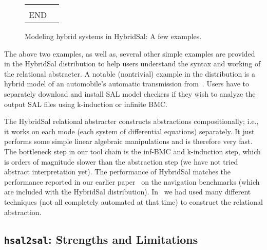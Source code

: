 \documentclass{llncs}
\begin{document}
\begin{figure}[htb!]
\begin{tt}
\begin{tabular}{ll}
\begin{minipage}{2in}
\begin{tabbing}
%
%
\\
END
\end{tabbing}
\end{minipage}
\end{tabular}
\end{tt}
\caption{Modeling hybrid systems in HybridSal: A few examples.}
\label{fig:ex}
\end{figure}

The above two examples, as well as,
several other simple examples are provided in the
HybridSal distribution to help
users understand the syntax and working of the
relational abstracter.  
A notable (nontrivial) example in the distribution is a hybrid
model of an automobile's automatic transmission from~\cite{ChutinanButts02:Mobies}.
Users have to separately
download and install SAL model checkers if they
wish to analyze the output SAL files using
k-induction or infinite BMC.

The HybridSal relational abstracter constructs abstractions
compositionally; i.e., it works on each mode 
(each system of differential equations) separately.
It just performs some simple linear algebraic manipulations
and is therefore very fast.  
The bottleneck step in our tool chain
is the inf-BMC and k-induction step,
which is orders of magnitude slower than the abstraction step
(we have not tried abstract interpretation yet).
The performance of HybridSal matches the performance reported 
in our earlier paper~\cite{ST11:CAVsmall} on the navigation
benchmarks (which are included with the HybridSal distribution).
In~\cite{ST11:CAVsmall} we had used many
different techniques (not all completely automated at that time)
to construct the relational abstraction.

\subsection{{\tt{hsal2sal}}: Strengths and Limitations}
\end{document}
